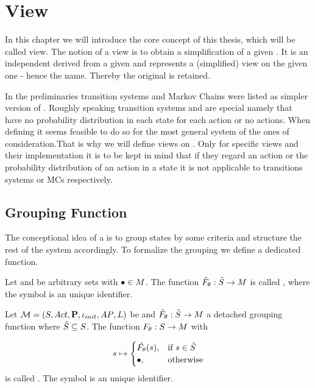 \documentclass[preview]{standalone}
\begin{document}
	
\section{View}  \label{ch:view}

In this chapter we will introduce the core concept of this thesis, which will be called view. The notion of a view is to obtain a simplification of a given \mdpN. It is an independent \mdpN derived from a given \mdpN and represents a (simplified) view on the given one - hence the name. Thereby the original \mdpN is retained.

In the preliminaries transition systems and Markov Chains were listed as simpler version of \mdpsN. Roughly speaking transition systems and \mdpsN are special \mdpsN namely that have no probability distribution in each state for each action or no actions. When defining \viewsN it seems feasible to do so for the most general system of the ones of consideration.That is why we will define views on \mdpsN. Only for specific views and their implementation it is to be kept in mind that if they regard an action or the probability distribution of an action in a state it is not applicable to transitions systems or MCs respectively.

\subsection{Grouping Function}
The conceptional idea of a \viewN is to group states by some criteria and structure the rest of the system accordingly. To formalize the grouping we define a dedicated function.

\begin{definition}
	Let \smstates and \arbset be arbitrary sets with ${\bullet} \in {M}$. The function ${\tilde{F}_{{\theta}}} : {\tilde{{S}}} \to {\ensuremath{{M}}}$ is called \emph{\grpfctsubN}, where the symbol \viewppty is an unique identifier.
	
	\label{def:grpfctsub}
\end{definition}


\begin{definition}
	Let ${{{\mathcal{M}}}} = {{({S}, {Act}, {\textbf{P}}, {\iota_{init}}, {AP}, {L})}}$ be \achgphN and ${\tilde{F}_{{\theta}}} : {\tilde{{S}}} \to {\ensuremath{{M}}}$ a detached grouping function where ${\tilde{{S}}} \subseteq {S}$. The function ${F_{{\theta}}} : {S} \to {\ensuremath{{M}}}$ with	
	
	\[
	\state \mapsto
	\begin{cases}
		\tilde\grpfct(s),				& \text{if } \state \in \smstates \\ 		\remelem,          	& \text{otherwise}
	\end{cases}
	\]	
	is called \emph{\grpfctN}. The symbol \viewppty is an unique identifier.
	
	\label{def:grpfct}
\end{definition}
\end{document}
